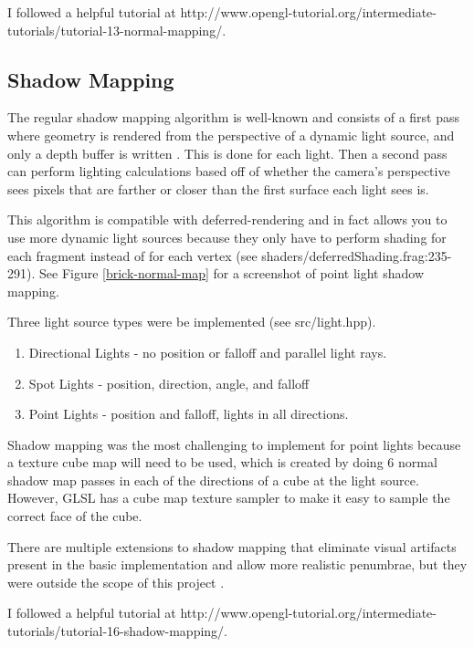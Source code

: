 \documentclass[oneside]{book}
\begin{document}
      I followed a helpful tutorial at http://www.opengl-tutorial.org/intermediate-tutorials/tutorial-13-normal-mapping/.

    \subsection{Shadow Mapping} \label{shadow-mapping}
      The regular shadow mapping algorithm is well-known and consists of a first pass where geometry is rendered from the perspective of a dynamic light source, and only a depth buffer is written \cite{williams1978casting}. This is done for each light. Then a second pass can perform lighting calculations based off of whether the camera's perspective sees pixels that are farther or closer than the first surface each light sees is.

      This algorithm is compatible with deferred-rendering and in fact allows you to use more dynamic light sources because they only have to perform shading for each fragment instead of for each vertex (see shaders/deferredShading.frag:235-291). See Figure \ref{brick-normal-map} for a screenshot of point light shadow mapping.

      Three light source types were be implemented (see src/light.hpp).
      \begin{enumerate}
        \item Directional Lights - no position or falloff and parallel light rays.
        \item Spot Lights - position, direction, angle, and falloff
        \item Point Lights - position and falloff, lights in all directions.
      \end{enumerate}

      Shadow mapping was the most challenging to implement for point lights because a texture cube map will need to be used, which is created by doing 6 normal shadow map passes in each of the directions of a cube at the light source. However, GLSL has a cube map texture sampler to make it easy to sample the correct face of the cube.

      There are multiple extensions to shadow mapping that eliminate visual artifacts present in the basic implementation and allow more realistic penumbrae, but they were outside the scope of this project \cite{dimitrov2007cascaded} \cite{fernando2005percentage}.

      I followed a helpful tutorial at http://www.opengl-tutorial.org/intermediate-tutorials/tutorial-16-shadow-mapping/.
\end{document}
